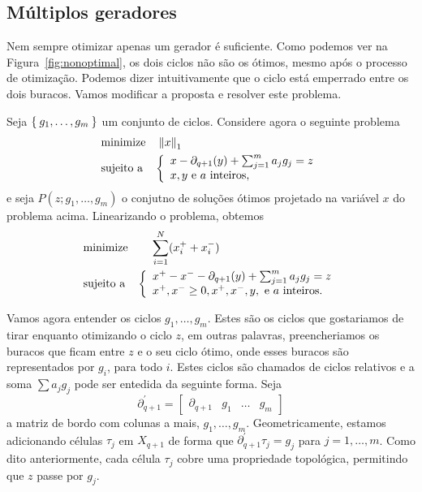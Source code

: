 \subsection{Múltiplos geradores}
Nem sempre otimizar apenas um gerador é suficiente. Como podemos ver na Figura~\ref{fig:nonoptimal},
os dois ciclos não são os ótimos, mesmo após o processo de otimização. Podemos dizer intuitivamente
que o ciclo está emperrado entre os dois buracos. Vamos modificar a proposta e resolver este problema. 

Seja $\Set{g_1, \dots, g_m}$ um conjunto de ciclos. Considere agora o seguinte problema
\begin{equation*}
    \begin{split}
        &\text{minimize} \quad \left\lVert x\right\rVert_1 \\
        &\text{sujeito a} \quad \left \{ \begin{array}{l}
            x- \partial_{q+1}(y) + \sum_{j=1}^m a_j g_j = z \\
            x, y \text{ e } a \text{ inteiros,}
        \end{array} \right.
    \end{split}
\end{equation*}
e seja $P(z;g_1, \dots, g_m)$ o conjutno de soluções ótimos projetado na variável
$x$ do problema acima. Linearizando o problema, obtemos
 \begin{equation*}
    \begin{split}
        &\text{minimize} \quad \quad  \sum_{i=1}^N (x^+_i + x^-_i) \\
        &\text{sujeito a} \quad \left \{ \begin{array}{l}
            x^+ - x^- - \partial_{q+1}(y) + \sum_{j=1}^m a_j g_j = z \\
            x^+, x^- \geq 0, x^+, x^-, y, \text{ e } a \text{ inteiros.}
        \end{array} \right.
    \end{split}
\end{equation*}

Vamos agora entender os ciclos $g_1, \dots, g_m$. Estes são os ciclos que 
gostariamos de tirar enquanto otimizando o ciclo $z$, em outras palavras,
preencheriamos os buracos que ficam entre $z$ e o seu ciclo ótimo,
onde esses buracos são representados por $g_i$, para todo $i$. Estes ciclos
são chamados de ciclos relativos e a soma $\sum a_j g_j$ pode ser entedida
da seguinte forma. Seja 
\begin{equation*}
    \partial^{'}_{q+1} = \begin{bmatrix} \partial_{q+1} & g_1 & \dots & g_m \end{bmatrix}
\end{equation*}
a matriz de bordo com colunas a mais, $g_1, \dots, g_m$. Geometricamente, estamos
adicionando células $\tau_j$ em $X_{q+1}$ de forma que $\partial^{'}_{q+1} \tau_j 
= g_j$ para $j=1,\dots,m$. Como dito anteriormente, cada célula $\tau_j$ cobre
uma propriedade topológica, permitindo que $z$ passe por $g_j$. 

